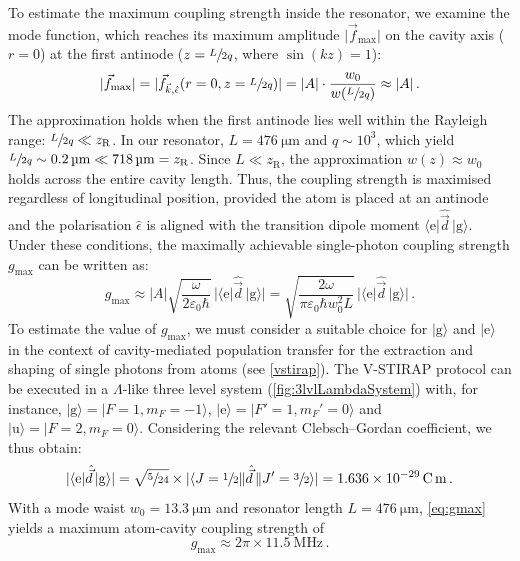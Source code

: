 \documentclass[../Thesis-IJspeert.tex]{subfiles}
\begin{document}
To estimate the maximum coupling strength inside the resonator, we examine the mode function, which reaches its maximum amplitude $\lvert \vec{f}_{\mathrm{max}} \rvert$ on the cavity axis ($r=0$) at the first antinode ($z = \sfrac{L}{2q}$, where $\sin(kz) = 1$): 
\begin{equation}
\lvert \vec{f}_{\mathrm{max}} \rvert = \lvert \vec{f}_{\vec{k},\hat{\epsilon}}(r=0, z=\sfrac{L}{2q}) \rvert = \lvert A \rvert \cdot \frac{w_0}{w(\sfrac{L}{2q})} \approx  \lvert A \rvert \,.
\end{equation}
The approximation holds when the first antinode lies well within the Rayleigh range: $\sfrac{L}{2q} \ll z_{\mathrm{R}}$. In our resonator, $L=\SI{476}{\micro\meter}$ and $q\sim 10^3$, which yield $\sfrac{L}{2q}\sim \SI{0.2}{\micro\meter} \ll \SI{718}{\micro\meter} = z_\mathrm{R}$.
Since $L \ll z_\mathrm{R}$, the approximation $w(z) \approx w_0$ holds across the entire cavity length. Thus, the coupling strength is maximised regardless of longitudinal position, provided the atom is placed at an antinode and the polarisation $\hat{\epsilon}$ is aligned with the transition dipole moment $\langle \mathrm{e} \vert \hat{\vec{d}}\, \vert \mathrm{g} \rangle$. Under these conditions, the maximally achievable single-photon coupling strength $g_{\mathrm{max}}$ can be written as:
\begin{equation}
g_{\mathrm{max}} \approx \lvert A \rvert \sqrt{\frac{\omega}{2\varepsilon_0 \hbar}} \, \lvert \langle \mathrm{e} \vert \hat{\vec{d}}\, \vert \mathrm{g} \rangle \rvert =  \sqrt{\frac{2\omega}{\pi\varepsilon_0 \hbar w_0^2 L}} \, \lvert \langle \mathrm{e} \vert \hat{\vec{d}}\, \vert \mathrm{g} \rangle \rvert \,.
\label{eq:gmax}
\end{equation}
To estimate the value of $g_\mathrm{max}$, we must consider a suitable choice for $\vert \mathrm{g} \rangle$ and $\vert \mathrm{e} \rangle$ in the context of cavity-mediated population transfer for the extraction and shaping of single photons from   atoms (see \autoref{vstirap}). The V-STIRAP protocol can be executed in a $\Lambda$-like three level system (\autoref{fig:3lvlLambdaSystem}) with, for instance, $\vert \mathrm{g} \rangle= \lvert F = 1, m_F = -1 \rangle$, $ \lvert \mathrm{e} \rangle = \lvert F' = 1, m_F' = 0 \rangle $ and $\lvert \mathrm{u} \rangle = \lvert F=2, m_F = 0 \rangle $. Considering the relevant Clebsch--Gordan coefficient, we thus obtain:
\begin{equation}
 \lvert \langle \mathrm{e} \vert \hat{\vec{d}}\, \vert \mathrm{g} \rangle \rvert = \sqrt{\sfrac{5}{24}} \times \lvert \langle J = \sfrac{1}{2} \| \hat{\vec{d}}\, \| J' = \sfrac{3}{2} \rangle \rvert= \SI{1.636e-29}{\coulomb\meter}\,.
\end{equation}
With a mode waist $ w_0 = \SI{13.3}{\micro\meter} $ and resonator length $ L = \SI{476}{\micro\meter}$, \autoref{eq:gmax} yields a maximum atom-cavity coupling strength of
\begin{equation}
g_{\mathrm{max}} \approx 2\pi\times\SI{11.5}{\mega\hertz}\,.
\end{equation}
\end{document}
